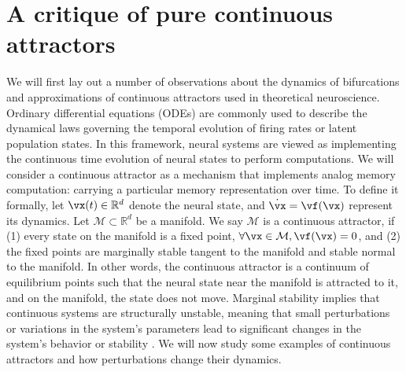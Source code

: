 \documentclass{article} %
\newcounter{ct}
\newcommand{\reals}{\mathbb{R}}
\newcommand{\manifold}{\mathcal{M}}
\theoremstyle{definition}
\theoremstyle{remark}
\renewcommand{\cite}{\citep}
\begin{document}
\section{A critique of pure continuous attractors}\label{sec:critique}
We will first lay out a number of observations about the dynamics of bifurcations and approximations of continuous attractors used in theoretical neuroscience.
Ordinary differential equations (ODEs) are commonly used to describe the dynamical laws governing the temporal evolution of firing rates or latent population states\cite{vyas2020}.
In this framework, neural systems are viewed as implementing the continuous time evolution of neural states to perform computations.
We will consider a continuous attractor as a mechanism that implements analog memory computation: carrying a particular memory representation over time.
To define it formally, let \(\vx(t) \in \reals^{d}\) denote the neural state, and \(\dot{\vx} = \vf(\vx)\) represent its dynamics.
Let \(\manifold \subset \reals^{d}\) be a manifold.
We say \(\manifold\) is a continuous attractor, if (1) every state on the manifold is a fixed point, \(\forall \vx \in \manifold, \vf(\vx) = 0\), and (2) the fixed points are marginally stable tangent to the manifold and stable normal to the manifold.
In other words, the continuous attractor is a continuum of equilibrium points such that the neural state near the manifold is attracted to it, and on the manifold, the state does not move.
Marginal stability implies that continuous systems are structurally unstable, meaning that small perturbations or variations in the system's parameters lead to significant changes in the system's behavior or stability \citep{peixoto1959structural, palis2000structural, robbin1971structural, robinson1974structural}.
We will now study some examples of continuous attractors and how perturbations change their dynamics.

\end{document}
